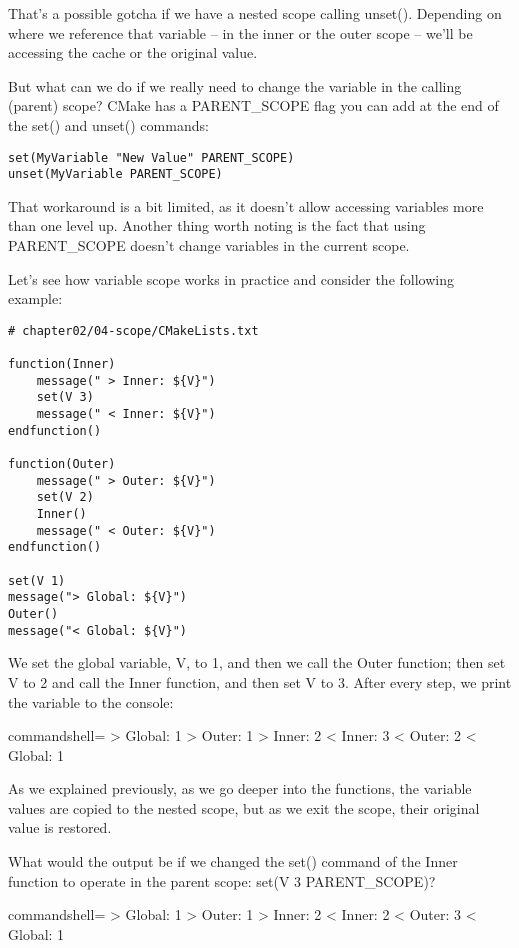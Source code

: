 That's a possible gotcha if we have a nested scope calling unset(). Depending on where we reference that variable – in the inner or the outer scope – we'll be accessing the cache or the original value.

But what can we do if we really need to change the variable in the calling (parent) scope?
CMake has a PARENT\_SCOPE flag you can add at the end of the set() and unset() commands:

\begin{lstlisting}[style=styleCMake]
set(MyVariable "New Value" PARENT_SCOPE)
unset(MyVariable PARENT_SCOPE)
\end{lstlisting}

That workaround is a bit limited, as it doesn't allow accessing variables more than one level up. Another thing worth noting is the fact that using PARENT\_SCOPE doesn't change variables in the current scope.

Let's see how variable scope works in practice and consider the following example:

\begin{lstlisting}[style=styleCMake]
# chapter02/04-scope/CMakeLists.txt

function(Inner)
	message(" > Inner: ${V}")
	set(V 3)
	message(" < Inner: ${V}")
endfunction()

function(Outer)
	message(" > Outer: ${V}")
	set(V 2)
	Inner()
	message(" < Outer: ${V}")
endfunction()

set(V 1)
message("> Global: ${V}")
Outer()
message("< Global: ${V}")
\end{lstlisting}

We set the global variable, V, to 1, and then we call the Outer function; then set V to 2 and call the Inner function, and then set V to 3. After every step, we print the variable to the console:

\begin{tcblisting}{commandshell={}}
> Global: 1
  > Outer: 1
    > Inner: 2
    < Inner: 3
  < Outer: 2
< Global: 1
\end{tcblisting}

As we explained previously, as we go deeper into the functions, the variable values are copied to the nested scope, but as we exit the scope, their original value is restored.

What would the output be if we changed the set() command of the Inner function to operate in the parent scope: set(V 3 PARENT\_SCOPE)?

\begin{tcblisting}{commandshell={}}
> Global: 1
  > Outer: 1
    > Inner: 2
    < Inner: 2
  < Outer: 3
< Global: 1
\end{tcblisting}

